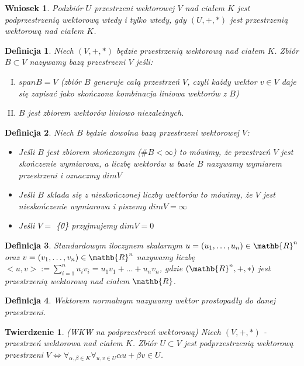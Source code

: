 \documentclass[12pt,a4paper]{article}
\newtheorem{df}{Definicja}[section]
\newtheorem{twr}{Twierdzenie}[section]
\newtheorem{wn}{Wniosek}[section]
\begin{document}
\begin{wn}
Podzbi\'or $U$ przestrzeni wektorowej $V$ nad cia{\l}em $K$ jest podprzestrzeni\k{a} wektorow\k{a} wtedy i tylko wtedy, gdy $(U, +, *)$ jest przestrzeni\k{a} wektorow\k{a} nad cia{\l}em $K$.
\end{wn}
\begin{df}
Niech $(V, +, *)$ b\k{e}dzie przestrzeni\k{a} wektorow\k{a} nad cia{\l}em $K$. Zbi\'{o}r $B \subset V$ nazywamy baz\k{a} przestrzeni $V$ je\'{s}li:
\begin{enumerate}[I.]
\item $span B = V$ (zbi\'{o}r $B$ generuje ca{\l}\k{a} przestrze\'{n} $V$, czyli ka\.{z}dy wektor $v \in V$ daje si\k{e} zapisa\'{c} jako sko\'{n}czona kombinacja liniowa wektor\'{o}w z $B$)
\item $B$ jest zbiorem wektor\'{o}w liniowo niezale\.{z}nych.
\end{enumerate}
\end{df}
\begin{df}
Niech $B$ b\k{e}dzie dowolna baz\k{a} przestrzeni wektorowej $V$:
\begin{itemize}
\item Je\'{s}li $B$ jest zbiorem sko\'{n}czonym ($\#B<\infty$) to m\'{o}wimy, \.{z}e przestrze\'{n} $V$ jest sko\'{n}czenie wymiarowa, a liczb\k{e} wektor\'{o}w w bazie $B$ nazywamy wymiarem przestrzeni i oznaczmy $dim V$
\item Je\'{s}li $B$ sk{\l}ada si\k{e} z niesko\'{n}czonej liczby wektor\'{o}w to m\'{o}wimy, \.{z}e $V$ jest niesko\'{n}czenie wymiarowa i piszemy $dim V = \infty$
\item Je\'{s}li $V =$ \{\={0}\} przyjmujemy $dim V = 0$
\end{itemize}
\end{df}
\begin{df}
Standardowym iloczynem skalarnym $u = (u_{1}, \dots, u_{n}) \in \mathb{R}^{n}$ oraz $v = (v_{1}, \dots, v_{n}) \in \mathb{R}^{n}$ nazywamy liczb\k{e} $<u, v> := \sum_{i=1}^{n} u_{i}v_{i} = u_{1}v_{1} + \dots + u_{n}v_{n}$, gdzie $(\mathb{R}^{n},+,*)$ jest przestrzeni\k{a} wektorow\k{a} nad cia{\l}em $\mathb{R}$.
\end{df}
\begin{df}
Wektorem normalnym nazywamy wektor prostopad{\l}y do danej przestrzeni.
\end{df}
\begin{twr}
(WKW na podprzestrze\'{n} wektorow\k{a}) \newline Niech  $(V, +, *)$ - przestrze\'{n} wektorowa nad cia{\l}em $K$. Zbi\'{o}r $U \subset V$ jest podprzestrzeni\k{a} wektorow\k{a} przestrzeni $V \Leftrightarrow \forall_{\alpha, \beta \in K} \forall_{u, v \in U} \alpha u + \beta v \in U$.
\end{twr}
\end{document}

